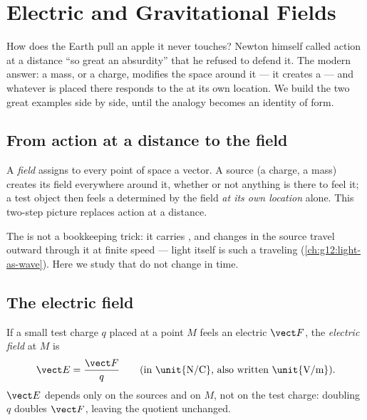 \chapter{Electric and Gravitational Fields}\label{ch:g11:electric-gravitational-fields}

How does the Earth pull an apple it never touches? Newton himself called
action at a distance ``so great an absurdity'' that he refused to defend
it. The modern answer: a mass, or a charge, modifies the space around it
--- it creates a \emph{} --- and whatever is placed there responds
to the  at its own location. We build the two great examples side
by side, until the analogy becomes an identity of form.

\section{From action at a distance to the field}

\begin{definition}[Field]\label{def:g11:electric-gravitational-fields:field}
A \emph{field} assigns to every point of space a vector. A
source (a charge, a mass) creates its field everywhere around it,
whether or not anything is there to feel it; a test object then feels a
 determined by the field \emph{at its own location} alone. This
two-step picture replaces action at a distance.
\end{definition}

\begin{remark}
The  is not a bookkeeping trick: it carries , and changes in
the source travel outward through it at finite speed --- light itself is
such a traveling  (\cref{ch:g12:light-as-wave}). Here we study
 that do not change in time.
\end{remark}

\section{The electric field}

\begin{definition}\label{def:g11:electric-gravitational-fields:efield}
If a small test charge $q$ placed at a point $M$ feels an electric 
$\vect F$, the \emph{electric field} at $M$ is
\[
\vect E = \frac{\vect F}{q}
\qquad \text{(in \unit{N/C}, also written \unit{V/m})}.
\]
$\vect E$ depends only on the sources and on $M$, not on the test
charge: doubling $q$ doubles $\vect F$, leaving the quotient unchanged.
\end{definition}

